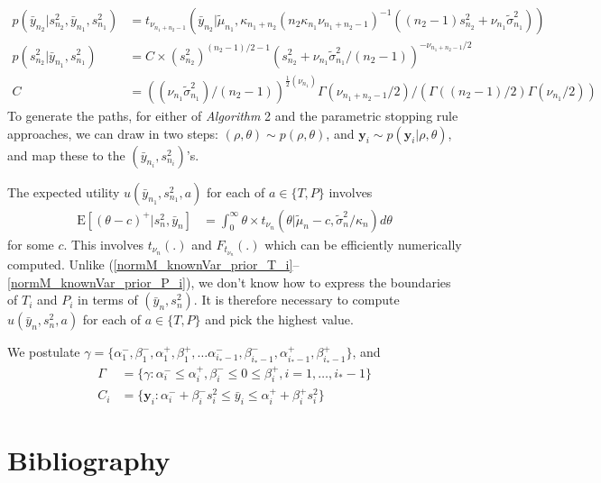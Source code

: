 \documentclass[11pt]{article}
\begin{document}
\begin{align}\label{conj_NG_barY}
p(\bar{y}_{n_2}|s_{n_2}^2,\bar{y}_{n_1},s_{n_1}^2)&=t_{\nu_{n_1+n_2-1}}(\bar{y}_{n_2}|\tilde\mu_{n_1},\kappa_{n_1+n_2}{(n_2\kappa_{n_1}\nu_{n_1+n_2-1})}^{-1}((n_2-1) s_{n_2}^2+\nu_{n_1} \tilde \sigma_{n_1}^2))\\\label{conj_NG_sSq}
p(s_{n_2}^2|\bar{y}_{n_1},s_{n_1}^2)&=C\times(s_{n_2}^2)^{(n_2-1)/2-1}(s_{n_2}^2+\nu_{n_1}\tilde \sigma_{n_1}^2/(n_2-1))^{-\nu_{n_1+n_2-1}/2}
\\C&=((\nu_{n_1}\tilde\sigma_{n_1}^2)/(n_2-1))^{\frac{1}{2}(\nu_{n_1})}\Gamma(\nu_{n_1+n_2-1}/2)/(\Gamma((n_2-1)/2)\Gamma(\nu_{n_1}/2))
\end{align}To generate the paths, for either of \emph{Algorithm} 2 and the parametric stopping rule approaches, we can draw in two steps: $(\rho,\theta)\sim p(\rho,\theta)$, and $\mathbf{y}_i\sim p(\mathbf{y}_i|\rho,\theta)$, and map these to the $(\bar{y}_{n_i},s_{n_i}^2)$'s. 

The expected utility $u(\bar{y}_{n_1},s^2_{n_1},a)$ for each of $a\in \{T,P\}$ involves
\begin{align}
\mathrm{E}[(\theta-c)^{+}|s_{n}^2,\bar{y}_{n}]&=\int_0^\infty \theta\times t_{\nu_{n}}(\theta |\tilde\mu_{n}-c,\tilde \sigma_{n}^2/\kappa_{n})  d\theta
\end{align}for some $c$. This involves $t_{\nu_{n}}(.)$ and $F_{t_{\nu_{n}}}(.)$ which can be efficiently numerically computed.  Unlike (\ref{normM_knownVar_prior_T_i}--\ref{normM_knownVar_prior_P_i}), we don't know how to express the boundaries of $T_i$ and $P_i$ in terms of $(\bar{y}_n,s^2_{n})$. It is therefore necessary to compute $u(\bar{y}_{n},s^2_{n},a)$ for each of $a\in\{T,P\}$ and pick the highest value. 

We postulate $\gamma=\{\alpha_1^{-},\beta_1^{-},\alpha_1^{+},\beta_1^{+},\ldots\alpha_{i_*-1}^{-},\beta_{i_*-1}^{-},\alpha_{i_*-1}^{+},\beta_{i_*-1}^{+}\}$, and
\begin{align}\Gamma &=\{\gamma: \alpha_{i}^{-}\leq \alpha_{i}^{+},\beta_{i}^{-} \leq 0\leq \beta_{i}^{+},i=1,\ldots,i_*-1\}\\
C_i &=\{\mathbf{y}_i:  \alpha_i^{-}+\beta_i^{-} s_i^2\leq\bar{y}_i\leq\alpha_i^{+}+\beta_i^{+} s_i^2\}
\end{align}

\section*{Bibliography}
\printbibliography[heading=none]
\end{document}
